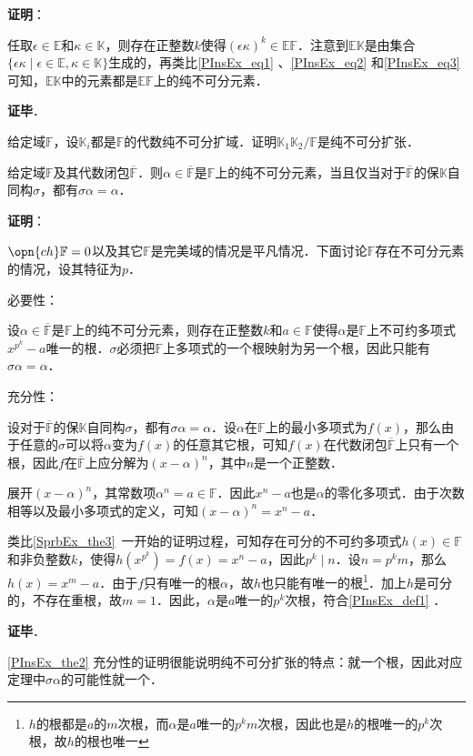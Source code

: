 \textbf{证明}：

任取$\epsilon\in\mathbb{E}$和$\kappa\in\mathbb{K}$，则存在正整数$k$使得$(\epsilon\kappa)^k\in\mathbb{EF}$．注意到$\mathbb{EK}$是由集合$\{\epsilon\kappa\mid\epsilon\in\mathbb{E}, \kappa\in\mathbb{K}\}$生成的，再类比\autoref{PInsEx_eq1} 、\autoref{PInsEx_eq2} 和\autoref{PInsEx_eq3} 可知，$\mathbb{EK}$中的元素都是$\mathbb{EF}$上的纯不可分元素．

\textbf{证毕}．


\begin{exercise}{}
给定域$\mathbb{F}$，设$\mathbb{K}_i$都是$\mathbb{F}$的代数纯不可分扩域．证明$\mathbb{K}_1\mathbb{K}_2/\mathbb{F}$是纯不可分扩张．
\end{exercise}

\begin{theorem}{}\label{PInsEx_the2}
给定域$\mathbb{F}$及其代数闭包$\overline{\mathbb{F}}$．则$\alpha\in\overline{\mathbb{F}}$是$\mathbb{F}$上的纯不可分元素，当且仅当对于$\overline{\mathbb{F}}$的保$\mathbb{K}$自同构$\sigma$，都有$\sigma\alpha=\alpha$．
\end{theorem}

\textbf{证明}：

$\opn{ch}\mathbb{F}=0$以及其它$\mathbb{F}$是完美域的情况是平凡情况．下面讨论$\mathbb{F}$存在不可分元素的情况，设其特征为$p$．

必要性：

设$\alpha\in\overline{\mathbb{F}}$是$\mathbb{F}$上的纯不可分元素，则存在正整数$k$和$a\in\mathbb{F}$使得$\alpha$是$\mathbb{F}$上不可约多项式$x^{p^k}-a$唯一的根．$\sigma$必须把$\mathbb{F}$上多项式的一个根映射为另一个根，因此只能有$\sigma\alpha=\alpha$．







充分性：

设对于$\overline{\mathbb{F}}$的保$\mathbb{K}$自同构$\sigma$，都有$\sigma\alpha=\alpha$．设$\alpha$在$\mathbb{F}$上的最小多项式为$f(x)$，那么由于任意的$\sigma$可以将$\alpha$变为$f(x)$的任意其它根，可知$f(x)$在代数闭包$\overline{\mathbb{F}}$上只有一个根，因此$f$在$\overline{\mathbb{F}}$上应分解为$(x-\alpha)^n$，其中$n$是一个正整数．

展开$(x-\alpha)^n$，其常数项$\alpha^n=a\in\mathbb{F}$．因此$x^n-a$也是$\alpha$的零化多项式．由于次数相等以及最小多项式的定义，可知$(x-\alpha)^n=x^n-a$．

类比\autoref{SprbEx_the3}~一开始的证明过程，可知存在可分的不可约多项式$h(x)\in\mathbb{F}$和非负整数$k$，使得$h(x^{p^k})=f(x)=x^n-a$，因此$p^k\mid n$．设$n=p^km$，那么$h(x)=x^m-a$．由于$f$只有唯一的根$\alpha$，故$h$也只能有唯一的根\footnote{$h$的根都是$a$的$m$次根，而$\alpha$是$a$唯一的$p^km$次根，因此也是$h$的根唯一的$p^k$次根，故$h$的根也唯一}．加上$h$是可分的，不存在重根，故$m=1$．因此，$\alpha$是$a$唯一的$p^k$次根，符合\autoref{PInsEx_def1} ．

\textbf{证毕}．

\autoref{PInsEx_the2} 充分性的证明很能说明纯不可分扩张的特点：就一个根，因此对应定理中$\sigma \alpha$的可能性就一个．








